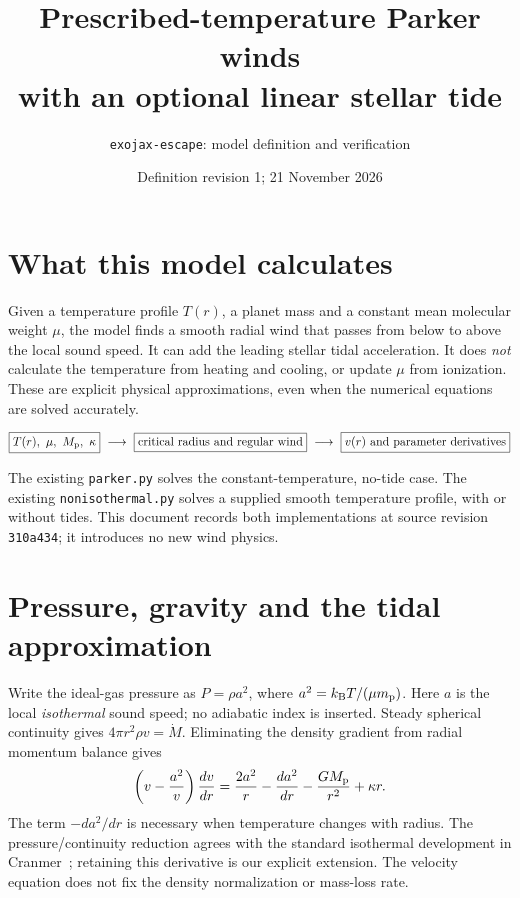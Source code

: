 \documentclass[10pt,a4paper]{article}
\title{Prescribed-temperature Parker winds\\with an optional linear stellar tide}
\author{\texttt{exojax-escape}: model definition and verification}
\date{Definition revision 1; 21 November 2026}
\begin{document}
\maketitle

\section{What this model calculates}
Given a temperature profile $T(r)$, a planet mass and a constant mean molecular
weight $\mu$, the model finds a smooth radial wind that passes from below to above
the local sound speed. It can add the leading stellar tidal acceleration. It does
\emph{not} calculate the temperature from heating and cooling, or update $\mu$
from ionization. These are explicit physical approximations, even when the
numerical equations are solved accurately.

\[
\boxed{T(r),\ \mu,\ M_{\rm p},\ \kappa}
\ \longrightarrow\ \boxed{\text{critical radius and regular wind}}
\ \longrightarrow\ \boxed{v(r)\ \text{and parameter derivatives}}
\]

The existing \texttt{parker.py} solves the constant-temperature, no-tide case.
The existing \texttt{nonisothermal.py} solves a supplied smooth temperature
profile, with or without tides. This document records both implementations
at source revision \texttt{310a434}; it introduces no new wind physics.

\section{Pressure, gravity and the tidal approximation}
Write the ideal-gas pressure as $P=\rho a^2$, where
$a^2=k_{\rm B}T/(\mu m_{\rm p})$. Here $a$ is the local \emph{isothermal}
sound speed; no adiabatic index is inserted. Steady spherical continuity gives
$4\pi r^2\rho v=\dot M$. Eliminating the density gradient from radial momentum
balance gives
\begin{equation}
 \left(v-\frac{a^2}{v}\right)\frac{dv}{dr}
 =\frac{2a^2}{r}-\frac{da^2}{dr}-\frac{GM_{\rm p}}{r^2}+\kappa r .
 \label{eq:explanation-momentum}
\end{equation}
The term $-da^2/dr$ is necessary when temperature changes with radius. The
pressure/continuity reduction agrees with the standard isothermal development
in Cranmer~\cite{cranmer}; retaining this derivative is our explicit extension.
The velocity equation does not fix the density normalization or mass-loss rate.
\end{document}
